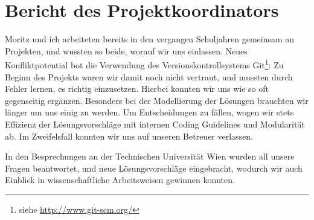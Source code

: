\documentclass[paper=a4,fontsize=12pt]{scrartcl}
\begin{document}

\section{Bericht des Projektkoordinators}

Moritz und ich arbeiteten bereits in den vergangen Schuljahren gemeinsam an Projekten, und wussten so beide, worauf wir uns einlassen. Neues Konfliktpotential bot die Verwendung des Versionskontrollsystems Git\footnote{siehe \url{http://www.git-scm.org/}}: Zu Beginn des Projekts waren wir damit noch nicht vertraut, und mussten durch Fehler lernen, es richtig einzusetzen. Hierbei konnten wir uns wie so oft gegenseitig ergänzen. Besonders bei der Modellierung der Lösungen brauchten wir länger um uns einig zu werden. Um Entscheidungen zu fällen, wogen wir stets Effizienz der Lösungsvorschläge mit internen Coding Guidelines und Modularität ab. Im Zweifelsfall konnten wir uns auf unseren Betreuer verlassen. 

In den Besprechungen an der Technischen Universität Wien wurden all unsere Fragen beantwortet, und neue Lösungsvorschläge eingebracht, wodurch wir auch Einblick in wissenschaftliche Arbeitsweisen gewinnen konnten.

\newpage
\printbibliography
{}
\listoffigures
{}
\listoftables
{}
\listofalgorithms
{}
\end{document}
